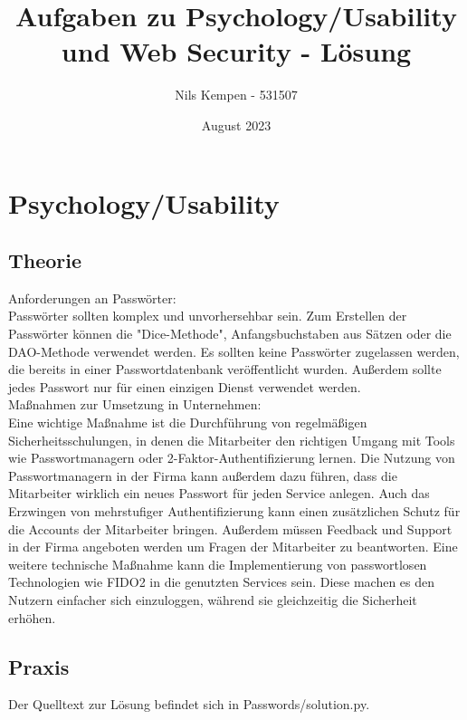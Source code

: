 \documentclass[ngerman]{article}
\title{Aufgaben zu Psychology/Usability und Web Security - Lösung}
\author{Nils Kempen - 531507}
\date{August 2023}
\begin{document}
\maketitle


\section{Psychology/Usability}

\subsection{Theorie}
Anforderungen an Passwörter:\\ 
Passwörter sollten komplex und unvorhersehbar sein. Zum Erstellen der Passwörter können die "Dice-Methode", Anfangsbuchstaben aus Sätzen oder die DAO-Methode verwendet werden.
Es sollten keine Passwörter zugelassen werden, die bereits in einer Passwortdatenbank veröffentlicht wurden.
Außerdem sollte jedes Passwort nur für einen einzigen Dienst verwendet werden.\\

\noindent Maßnahmen zur Umsetzung in Unternehmen:\\
Eine wichtige Maßnahme ist die Durchführung von regelmäßigen Sicherheitsschulungen, in denen die Mitarbeiter den richtigen Umgang mit Tools wie Passwortmanagern oder 2-Faktor-Authentifizierung lernen.
Die Nutzung von Passwortmanagern in der Firma kann außerdem dazu führen, dass die Mitarbeiter wirklich ein neues Passwort für jeden Service anlegen. Auch das Erzwingen von mehrstufiger Authentifizierung kann einen zusätzlichen Schutz für die Accounts der Mitarbeiter bringen.
Außerdem müssen Feedback und Support in der Firma angeboten werden um Fragen der Mitarbeiter zu beantworten.
Eine weitere technische Maßnahme kann die Implementierung von passwortlosen Technologien wie FIDO2 in die genutzten Services sein. Diese machen es den Nutzern einfacher sich einzuloggen, während sie gleichzeitig die Sicherheit erhöhen. 


\subsection{Praxis}
Der Quelltext zur Lösung befindet sich in Passwords/solution.py.
\end{document}
